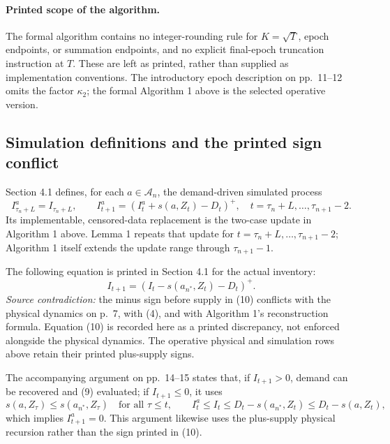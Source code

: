 \documentclass{article}
\begin{document}
\paragraph{Printed scope of the algorithm.}
The formal algorithm contains no integer-rounding rule for \(K=\sqrt T\), epoch endpoints, or summation endpoints, and no explicit final-epoch truncation instruction at \(T\). These are left as printed, rather than supplied as implementation conventions. The introductory epoch description on pp.\ 11--12 omits the factor \(\kappa_2\); the formal Algorithm 1 above is the selected operative version.

\subsection*{Simulation definitions and the printed sign conflict}
Section 4.1 defines, for each \(a\in\mathcal A_n\), the demand-driven simulated process
\begin{equation}
I^a_{\tau_n+L}=I_{\tau_n+L},\qquad
I^a_{t+1}=(I^a_t+s(a,Z_t)-D_t)^+,
\quad t=\tau_n+L,\ldots,\tau_{n+1}-2.\tag{9}
\end{equation}
Its implementable, censored-data replacement is the two-case update in Algorithm 1 above. Lemma 1 repeats that update for \(t=\tau_n+L,\ldots,\tau_{n+1}-2\); Algorithm 1 itself extends the update range through \(\tau_{n+1}-1\).

The following equation is printed in Section 4.1 for the actual inventory:
\begin{equation}
I_{t+1}=(I_t-s(a_{n^*},Z_t)-D_t)^+.\tag{10, printed}
\end{equation}
\emph{Source contradiction:} the minus sign before supply in (10) conflicts with the physical dynamics on p.\ 7, with (4), and with Algorithm 1's reconstruction formula. Equation (10) is recorded here as a printed discrepancy, not enforced alongside the physical dynamics. The operative physical and simulation rows above retain their printed plus-supply signs.

The accompanying argument on pp.\ 14--15 states that, if \(I_{t+1}>0\), demand can be recovered and (9) evaluated; if \(I_{t+1}\leq0\), it uses
\[
s(a,Z_\tau)\leq s(a_{n^*},Z_\tau)\quad\text{for all }\tau\leq t,
\qquad
I_t^a\leq I_t\leq D_t-s(a_{n^*},Z_t)\leq D_t-s(a,Z_t),
\]
which implies \(I_{t+1}^a=0\). This argument likewise uses the plus-supply physical recursion rather than the sign printed in (10).
\end{document}
